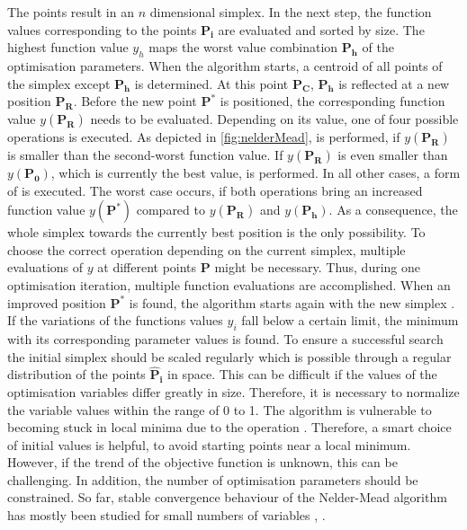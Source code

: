 The points result in an $n$ dimensional simplex. In the next step, the function values corresponding to the points $\mathbf{P_i}$ are evaluated and sorted by size. The highest function value $y_h$ maps the worst value combination $\mathbf{P_h}$ of the optimisation parameters. When the algorithm starts, a centroid of all points of the simplex except $\mathbf{P_h}$ is determined. At this point $\mathbf{P_C}$, $\mathbf{P_h}$ is reflected at a new position $\mathbf{P_R}$. Before the new point $\mathbf{P^{*}}$ is positioned, the corresponding function value $y(\mathbf{P_R})$ needs to be evaluated. Depending on its value, one of four possible operations is executed. As depicted in \autoref{fig:nelderMead},  is performed, if $y(\mathbf{P_R})$ is smaller than the second-worst function value. If $y(\mathbf{P_R})$ is even smaller than $y(\mathbf{P_0})$, which is currently the best value,  is performed. In all other cases, a form of  is executed. The worst case occurs, if both  operations bring an increased function value $y(\mathbf{P^*})$ compared to $y(\mathbf{P_R})$ and $y(\mathbf{P_h})$. As a consequence,  the whole simplex towards the currently best position is the only possibility. To choose the correct operation depending on the current simplex, multiple evaluations of $y$ at different points $\mathbf{P}$ might be necessary. Thus, during one optimisation iteration, multiple function evaluations are accomplished. When an improved position $\mathbf{P^{*}}$ is found, the algorithm starts again with the new simplex \cite{nelder_simplex_1965}. \\

If the variations of the functions values $y_i$ fall below a certain limit, the minimum with its corresponding parameter values is found. To ensure a successful search the initial simplex should be scaled regularly \cite{baudin_nelder-mead_nodate} which is possible through a regular distribution of the points $\mathbf{\hat{P}_i}$ in space. This can be difficult if the values of the optimisation variables differ greatly in size. Therefore, it is necessary to normalize the variable values within the range of 0 to 1. The algorithm is vulnerable to becoming stuck in local minima due to the  operation \cite{luersen_globalized_2004}. Therefore, a smart choice of initial values is helpful, to avoid starting points near a local minimum. However, if the trend of the objective function is unknown, this can be challenging. In addition, the number of optimisation parameters should be constrained. So far, stable convergence behaviour of the Nelder-Mead algorithm has mostly been studied for small numbers of variables \cite{singer_efficient_2004}, \cite{pham_comparative_2011}.





